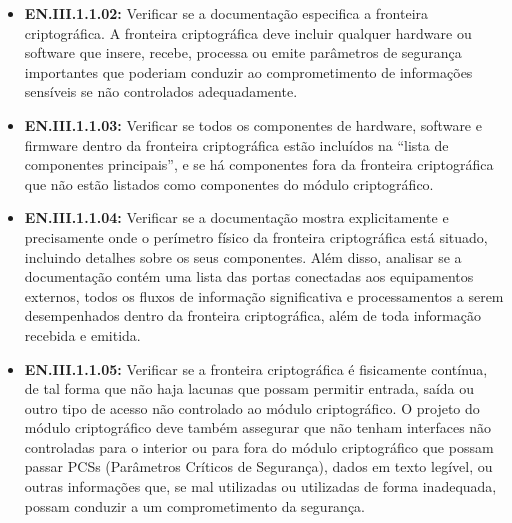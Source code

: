 \begin{itemize}[leftmargin=*, nosep]
\begin{itemize}
            \item Encapsulamentos/revestimentos, incluindo quaisquer portas de acesso removíveis ou coberturas/camadas;
            \item Conectores físicos para dispositivos externos ao módulo criptográfico, ou entre quaisquer submódulos independentes do módulo principal;
            \item Módulos de software/firmware que são modificáveis;
            \item Módulos de software/firmware que não são modificáveis;
            \item Outros tipos de componentes que não estão listados acima.
        \end{itemize}
        \item \textbf{EN.III.1.1.02:} Verificar se a documentação especifica a fronteira criptográfica. A fronteira criptográfica deve incluir qualquer hardware ou software que insere, recebe, processa ou emite parâmetros de segurança importantes que poderiam conduzir ao comprometimento de informações sensíveis se não controlados adequadamente.
        \item \textbf{EN.III.1.1.03:} Verificar se todos os componentes de hardware, software e firmware dentro da fronteira criptográfica estão incluídos na “lista de componentes principais”, e se há componentes fora da fronteira criptográfica que não estão listados como componentes do módulo criptográfico.
        \item \textbf{EN.III.1.1.04:} Verificar se a documentação mostra explicitamente e precisamente onde o perímetro físico da fronteira criptográfica está situado, incluindo detalhes sobre os seus componentes. Além disso, analisar se a documentação contém uma lista das portas conectadas aos equipamentos externos, todos os fluxos de informação significativa e processamentos a serem desempenhados dentro da fronteira criptográfica, além de toda informação recebida e emitida.
        \item \textbf{EN.III.1.1.05:} Verificar se a fronteira criptográfica é fisicamente contínua, de tal forma que não haja lacunas que possam permitir entrada, saída ou outro tipo de acesso não controlado ao módulo criptográfico. O projeto do módulo criptográfico deve também assegurar que não tenham interfaces não controladas para o interior ou para fora do módulo criptográfico que possam passar PCSs (Parâmetros Críticos de Segurança), dados em texto legível, ou outras informações que, se mal utilizadas ou utilizadas de forma inadequada, possam conduzir a um comprometimento da segurança.

\end{itemize}
